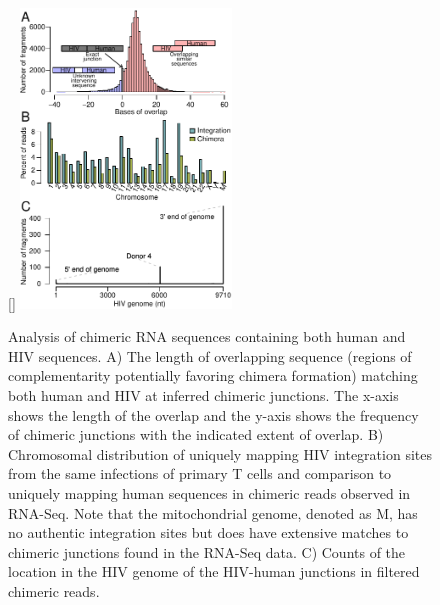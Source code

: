 \documentclass[../sherrill-Mix_thesis.tex]{subfiles}
\begin{document}
		\begin{figure}
				\centering
				[\FBwidth]{
					\includegraphics[width=0.5\textwidth]{chimeraCombo.pdf}
				}{
					\caption[Chimeric RNA sequences containing both human and HIV sequences]{Analysis of chimeric RNA sequences containing both human and HIV sequences. A) The length of overlapping sequence (regions of complementarity potentially favoring chimera formation) matching both human and HIV at inferred chimeric junctions. The x-axis shows the length of the overlap and the y-axis shows the frequency of chimeric junctions with the indicated extent of overlap.  B) Chromosomal distribution of uniquely mapping HIV integration sites from the same infections of primary T cells and comparison to uniquely mapping human sequences in chimeric reads observed in RNA-Seq. Note that the mitochondrial genome, denoted as M, has no authentic integration sites but does have extensive matches to chimeric junctions found in the RNA-Seq data. C) Counts of the location in the HIV genome of the HIV-human junctions in filtered chimeric reads.} %
					\label{figChimera}
				}
		\end{figure}
\end{document}
